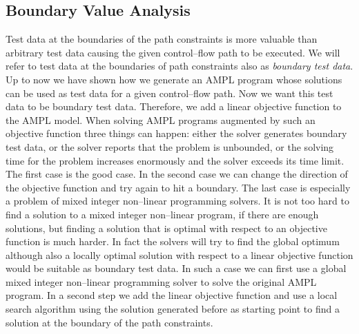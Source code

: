 \documentclass[runningheads,a4paper]{llncs}%
\begin{document}
\subsection{Boundary Value Analysis}%
\label{sec:BoundaryValueAnalysis}%
Test data at the boundaries of the path constraints is more valuable than arbitrary test data causing the given control--flow path to be executed. We will refer to test data at the boundaries of path constraints also as \emph{boundary test data}. Up to now we have shown how we generate an AMPL program whose solutions can be used as test data for a given control--flow path. Now we want this test data to be boundary test data. Therefore, we add a linear objective function to the AMPL model. When solving AMPL programs augmented by such an objective function three things can happen: either the solver generates boundary test data, or the solver reports that the problem is unbounded, or the solving time for the problem increases enormously and the solver exceeds its time limit. The first case is the good case. In the second case we can change the direction of the objective function and try again to hit a boundary. The last case is especially a problem of mixed integer non--linear programming solvers. It is not too hard to find a solution to a mixed integer non--linear program, if there are enough solutions, but finding a solution that is optimal with respect to an objective function is much harder. In fact the solvers will try to find the global optimum although also a locally optimal solution with respect to a linear objective function would be suitable as boundary test data. In such a case we can first use a global mixed integer non--linear programming solver to solve the original AMPL program. In a second step we add the linear objective function and use a local search algorithm using the solution generated before as starting point to find a solution at the boundary of the path constraints.
\end{document}
